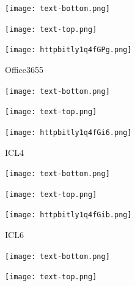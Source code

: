 \documentclass[letterpaper]{article}
\begin{document}
 \centerline{\texttt{[image: text-bottom.png]}} 
 
 \pagebreak 
{} 
 \vspace*{\fill} 
 
  \centerline{\texttt{[image: text-top.png]}} 
 
 \vspace{0.5in} 
 
 \begingroup 
 \centerline{\texttt{[image: httpbitly1q4fGPg.png]}} 
 \endgroup 
 \vspace*{\fill} 

 \hfill{\small Office3655} 

  \vspace{0.7in} 
 
 \centerline{\texttt{[image: text-bottom.png]}} 
 
 \pagebreak 
{} 
 \vspace*{\fill} 
 
  \centerline{\texttt{[image: text-top.png]}} 
 
 \vspace{0.5in} 
 
 \begingroup 
 \centerline{\texttt{[image: httpbitly1q4fGi6.png]}} 
 \endgroup 
 \vspace*{\fill} 

 \hfill{\small ICL4} 

  \vspace{0.7in} 
 
 \centerline{\texttt{[image: text-bottom.png]}} 
 
 \pagebreak 
{} 
 \vspace*{\fill} 
 
  \centerline{\texttt{[image: text-top.png]}} 
 
 \vspace{0.5in} 
 
 \begingroup 
 \centerline{\texttt{[image: httpbitly1q4fGib.png]}} 
 \endgroup 
 \vspace*{\fill} 

 \hfill{\small ICL6} 

  \vspace{0.7in} 
 
 \centerline{\texttt{[image: text-bottom.png]}} 
 
 \pagebreak 
{} 
 \vspace*{\fill} 
 
  \centerline{\texttt{[image: text-top.png]}} 
 
 \vspace{0.5in} 
 
\end{document}
